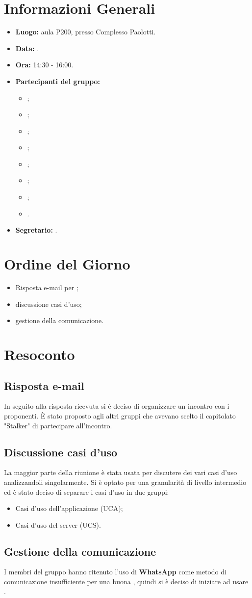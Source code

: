 \section{Informazioni Generali}
\begin{itemize}
\item \textbf{Luogo:} aula P200, presso Complesso Paolotti.
\item \textbf{Data:} \Data.
\item \textbf{Ora:} 14:30 - 16:00.
\item \textbf{Partecipanti del gruppo:}
	\begin{itemize}
		\item \AT{}; 
		\item \BR{};
		\item \CE{}; 
		\item \DF{};
		\item \LD{};
		\item \MC{};
		\item \PF{};
		\item \SE{}.
	\end{itemize} 
\item \textbf{Segretario:} \DF{}.
\end{itemize}


\section{Ordine del Giorno}
\begin{itemize}
\item Risposta e-mail per \Proponente{};
\item discussione casi d'uso;
\item gestione della comunicazione.
\end{itemize}

\section{Resoconto}
\subsection{Risposta e-mail \Proponente{}}
In seguito alla risposta ricevuta si è deciso di organizzare un incontro con i proponenti.
È stato proposto agli altri gruppi che avevano scelto il capitolato "Stalker" di partecipare all'incontro. 

\subsection{Discussione casi d'uso}
La maggior parte della riunione è stata usata per discutere dei vari casi d'uso analizzandoli singolarmente.
Si è optato per una granularità di livello intermedio ed è stato deciso di separare i casi d'uso in due gruppi:
\begin{itemize}
\item Casi d'uso dell'applicazione (UCA);
\item Casi d'uso del server (UCS).
\end{itemize}


\subsection{Gestione della comunicazione}
I membri del gruppo hanno ritenuto l'uso di \textbf{WhatsApp} come metodo di comunicazione insufficiente per una buona , quindi si è deciso di iniziare ad usare .

\clearpage